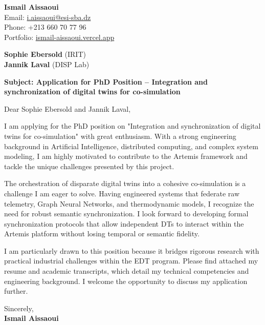 \documentclass[11pt,a4paper]{article}
\begin{document}
\thispagestyle{empty}

\begin{flushright}
\textbf{Ismail Aissaoui} \\
Email: \href{mailto:i.aissaoui@esi-sba.dz}{i.aissaoui@esi-sba.dz} \\
Phone: +213 660 70 77 96 \\
Portfolio: \href{https://ismail-aissaoui.vercel.app}{ismail-aissaoui.vercel.app}
\end{flushright}

\vspace{1em}

\begin{flushleft}
\textbf{Sophie Ebersold} (IRIT) \\
\textbf{Jannik Laval} (DISP Lab)
\end{flushleft}

\vspace{1em}
\noindent\textbf{Subject: Application for PhD Position -- Integration and synchronization of digital twins for co-simulation}
\vspace{1em}

\noindent Dear Sophie Ebersold and Jannik Laval,

\vspace{1em}
\noindent
I am applying for the PhD position on "Integration and synchronization of digital twins for co-simulation" with great enthusiasm. With a strong engineering background in Artificial Intelligence, distributed computing, and complex system modeling, I am highly motivated to contribute to the Artemis framework and tackle the unique challenges presented by this project.

\vspace{0.5em}
\noindent
The orchestration of disparate digital twins into a cohesive co-simulation is a challenge I am eager to solve. Having engineered systems that federate raw telemetry, Graph Neural Networks, and thermodynamic models, I recognize the need for robust semantic synchronization. I look forward to developing formal synchronization protocols that allow independent DTs to interact within the Artemis platform without losing temporal or semantic fidelity.

\vspace{0.5em}
\noindent
I am particularly drawn to this position because it bridges rigorous research with practical industrial challenges within the EDT program. Please find attached my resume and academic transcripts, which detail my technical competencies and engineering background. I welcome the opportunity to discuss my application further.

\vspace{1.5em}
\noindent
Sincerely, \\[0.5em]
\textbf{Ismail Aissaoui}
\end{document}

